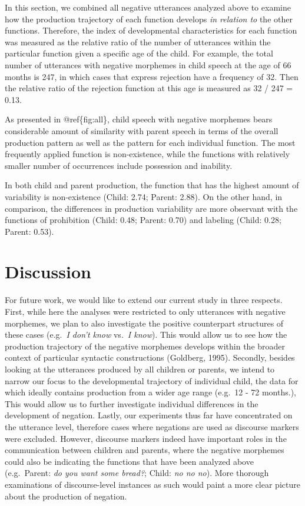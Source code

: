 \documentclass[10pt, letterpaper]{article}
\begin{document}
In this section, we combined all negative utterances analyzed above to
examine how the production trajectory of each function develops \emph{in
relation to} the other functions. Therefore, the index of developmental
characteristics for each function was measured as the relative ratio of
the number of utterances within the particular function given a specific
age of the child. For example, the total number of utterances with
negative morphemes in child speech at the age of 66 months is 247, in
which cases that express rejection have a frequency of 32. Then the
relative ratio of the rejection function at this age is measured as 32 /
247 = 0.13.

As presented in @ref\{fig:all\}, child speech with negative morphemes
bears considerable amount of similarity with parent speech in terms of
the overall production pattern as well as the pattern for each
individual function. The most frequently applied function is
non-existence, while the functions with relatively smaller number of
occurrences include possession and inability.

In both child and parent production, the function that has the highest
amount of variability is non-existence (Child: 2.74; Parent: 2.88). On
the other hand, in comparison, the differences in production variability
are more observant with the functions of prohibition (Child: 0.48;
Parent: 0.70) and labeling (Child: 0.28; Parent: 0.53).

\hypertarget{discussion}{%
\section{Discussion}\label{discussion}}

For future work, we would like to extend our current study in three
respects. First, while here the analyses were restricted to only
utterances with negative morphemes, we plan to also investigate the
positive counterpart structures of these cases (e.g.~\emph{I don't know}
vs.~\emph{I know}). This would allow us to see how the production
trajectory of the negative morphemes develops within the broader context
of particular syntactic constructions (Goldberg, 1995). Secondly,
besides looking at the utterances produced by all children or parents,
we intend to narrow our focus to the developmental trajectory of
individual child, the data for which ideally contains production from a
wider age range (e.g.~12 - 72 months.), This would allow us to further
investigate individual differences in the development of negation.
Lastly, our experiments thus far have concentrated on the utterance
level, therefore cases where negations are used as discourse markers
were excluded. However, discourse markers indeed have important roles in
the communication between children and parents, where the negative
morphemes could also be indicating the functions that have been analyzed
above (e.g.~Parent: \emph{do you want some bread?}; Child: \emph{no no
no}). More thorough examinations of discourse-level instances as such
would paint a more clear picture about the production of negation.
\end{document}
